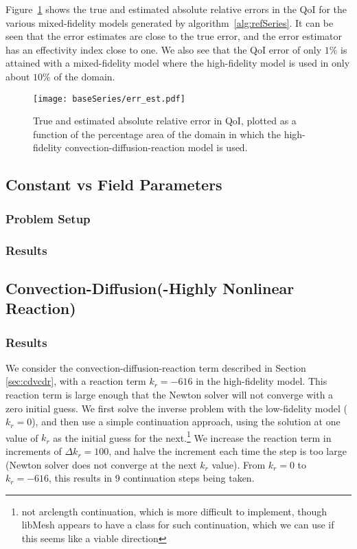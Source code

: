 Figure~\ref{fig:baseErr} shows the true and estimated absolute relative errors in the QoI for the various mixed-fidelity models generated by algorithm~\ref{alg:refSeries}. It can be seen that the error estimates are close to the true error, and the error estimator has an effectivity index close to one. We also see that the QoI error of only $1\%$ is attained with a mixed-fidelity model where the high-fidelity model is used in only about $10\%$ of the domain.
%
\begin{figure}[h]
\centering
\texttt{[image: baseSeries/err\_est.pdf]}
\caption{True and estimated absolute relative error in QoI, plotted as a function of the percentage area of the domain in which the high-fidelity convection-diffusion-reaction model is used.}
\label{fig:baseErr}
\end{figure}
%
\subsection{Constant vs Field Parameters}
%
\subsubsection{Problem Setup}
%
\subsubsection{Results}
%
\subsection{Convection-Diffusion(-Highly Nonlinear Reaction)}
%
\subsubsection{Results}
%
We consider the convection-diffusion-reaction term described in Section \ref{sec:cdvcdr}, with a reaction term $k_r=-616$ in the high-fidelity model. This reaction term is large enough that the Newton solver will not converge with a zero initial guess. We first solve the inverse problem with the low-fidelity model ($k_r=0$), and then use a simple continuation approach, using the solution at one value of $k_r$ as the initial guess for the next.\footnote{not arclength continuation, which is more difficult to implement, though libMesh appears to have a class for such continuation, which we can use if this seems like a viable direction} We increase the reaction term in increments of $\Delta k_r=100$, and halve the increment each time the step is too large (Newton solver does not converge at the next $k_r$ value). From $k_r=0$ to $k_r=-616$, this results in 9 continuation steps being taken.
%
